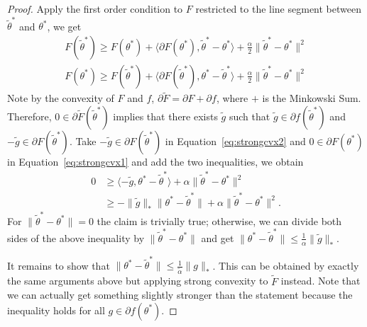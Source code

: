 \begin{proof}
	Apply the first order condition to $F$ restricted to the line segment between $\tilde{\theta}^*$ and $\theta^*$, we get
	\begin{align}
	F(\tilde{\theta}^*) \geq F(\theta^*)  +  \langle \partial F(\theta^*),  \tilde{\theta}^*-\theta^* \rangle  + \frac{\alpha}{2}\|\tilde{\theta}^*-\theta^*\|^2\label{eq:strongcvx1} \\
	F(\theta^*) \geq F(\tilde{\theta}^*)  +  \langle \partial F(\tilde{\theta}^*),  \theta^*-\tilde{\theta}^* \rangle  + \frac{\alpha}{2}\|\tilde{\theta}^*-\theta^*\|^2 \label{eq:strongcvx2}
	\end{align}
	Note by the convexity of $F$ and $f$, $\partial\tilde{F}=  \partial F + \partial f$, where $+$ is the Minkowski Sum. Therefore, $0\in \partial\tilde{F}(\tilde{\theta}^*)$ implies that there exists $\tilde{g}$ such that $\tilde{g}\in \partial f(\tilde{\theta}^*)$ and $-\tilde{g}\in\partial F(\tilde{\theta}^*)$.
	Take $-\tilde{g}\in\partial F(\tilde{\theta}^*)$ in Equation~\ref{eq:strongcvx2} and $0 \in \partial F(\theta^*)$ in Equation~\ref{eq:strongcvx1}  and add the two inequalities, we obtain
	\begin{align*}
		0&\geq \langle -\tilde{g},  \theta^*-\tilde{\theta}^* \rangle  + \alpha \|\tilde{\theta}^* - \theta^*\|^2 \\ &\geq - \|\tilde{g}\|_* \|\theta^*-\tilde{\theta}^*\|  +  \alpha\|\tilde{\theta}^* - \theta^*\|^2. 
	\end{align*}
	For $\|\tilde{\theta}^* - \theta^*\|=0$ the claim is trivially true; otherwise, we can divide  both sides of the above inequality by $\|\tilde{\theta}^* - \theta^*\|$ and get
	$	\|\theta^*-\tilde{\theta}^*\| \leq \frac{1}{\alpha}\| \tilde{g}\|_*$. 
	
	It remains to show that $\|\theta^*-\tilde{\theta}^*\| \leq \frac{1}{\tilde{\alpha}}\|g\|_*$. This can be obtained by exactly the same arguments above but applying strong convexity to $\tilde{F}$ instead. Note that we can actually get something slightly stronger than the statement because the inequality holds for all $g\in \partial f(\theta^*)$.
\end{proof}




